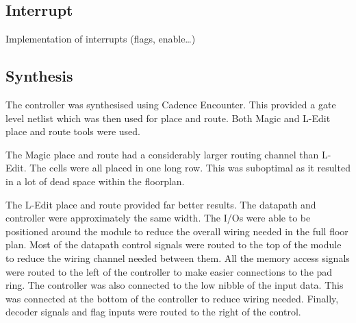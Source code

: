 \subsection{Interrupt}


Implementation of interrupts (flags, enable\dots)


\subsection{Synthesis}

The controller was synthesised using Cadence Encounter. 
This provided a gate level netlist which was then used for place and route.
Both Magic and L-Edit place and route tools were used. 

The Magic place and route had a considerably larger routing channel than L-Edit.
The cells were all placed in one long row. 
This was suboptimal as it resulted in a lot of dead space within the floorplan.

The L-Edit place and route provided far better results. 
The datapath and controller were approximately the same width. 
The I/Os were able to be positioned around the module to reduce the overall wiring needed in the full floor plan. 
Most of the datapath control signals were routed to the top of the module to reduce the wiring channel needed between them.
All the memory access signals were routed to the left of the controller to make easier connections to the pad ring. 
The controller was also connected to the low nibble of the input data. 
This was connected at the bottom of the controller to reduce wiring needed. 
Finally, decoder signals and flag inputs were routed to the right of the control. 


